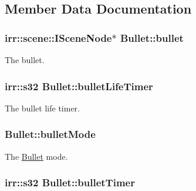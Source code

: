 \subsection{Member Data Documentation}
\hypertarget{class_bullet_a1269c5dd9e8fde8489ecccb2b63a7675}{
\subsubsection[{bullet}]{\setlength{\rightskip}{0pt plus 5cm}irr\-::scene\-::\-I\-Scene\-Node$\ast$ Bullet\-::bullet\hspace{0.3cm}{\ttfamily [private]}}}\label{class_bullet_a1269c5dd9e8fde8489ecccb2b63a7675}


The bullet. 

\hypertarget{class_bullet_a5d564a2ba54760b213cc65a34c2a9bd5}{
\subsubsection[{bullet\-Life\-Timer}]{\setlength{\rightskip}{0pt plus 5cm}irr\-::s32 Bullet\-::bullet\-Life\-Timer\hspace{0.3cm}{\ttfamily [private]}}}\label{class_bullet_a5d564a2ba54760b213cc65a34c2a9bd5}


The bullet life timer. 

\hypertarget{class_bullet_a71410182ef75dfa9bffa3103e3115a5f}{
\subsubsection[{bullet\-Mode}]{ Bullet\-::bullet\-Mode\hspace{0.3cm}{\ttfamily [private]}}}\label{class_bullet_a71410182ef75dfa9bffa3103e3115a5f}


The \hyperlink{class_bullet}{Bullet} mode. 

\hypertarget{class_bullet_ac1b4825f9227b4411529519edce96ead}{
\subsubsection[{bullet\-Timer}]{\setlength{\rightskip}{0pt plus 5cm}irr\-::s32 Bullet\-::bullet\-Timer\hspace{0.3cm}{\ttfamily [private]}}}\label{class_bullet_ac1b4825f9227b4411529519edce96ead}


